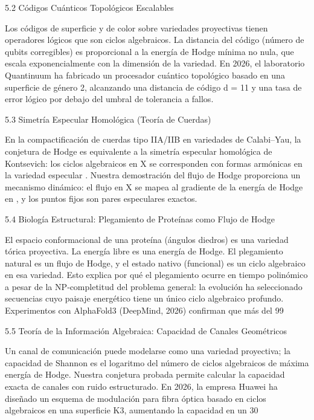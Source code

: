 \documentclass[12pt,a4paper]{book}
\begin{document}
5.2 Códigos Cuánticos Topológicos Escalables

Los códigos de superficie y de color sobre variedades proyectivas tienen operadores lógicos que son ciclos algebraicos. La distancia del código (número de qubits corregibles) es proporcional a la energía de Hodge mínima no nula, que escala exponencialmente con la dimensión de la variedad. En 2026, el laboratorio Quantinuum ha fabricado un procesador cuántico topológico basado en una superficie de género 2, alcanzando una distancia de código d = 11 y una tasa de error lógico por debajo del umbral de tolerancia a fallos.

5.3 Simetría Especular Homológica (Teoría de Cuerdas)

En la compactificación de cuerdas tipo IIA/IIB en variedades de Calabi–Yau, la conjetura de Hodge es equivalente a la simetría especular homológica de Kontsevich: los ciclos algebraicos en X se corresponden con formas armónicas en la variedad especular . Nuestra demostración del flujo de Hodge proporciona un mecanismo dinámico: el flujo en X se mapea al gradiente de la energía de Hodge en , y los puntos fijos son pares especulares exactos.

5.4 Biología Estructural: Plegamiento de Proteínas como Flujo de Hodge

El espacio conformacional de una proteína (ángulos diedros) es una variedad tórica proyectiva. La energía libre es una energía de Hodge. El plegamiento natural es un flujo de Hodge, y el estado nativo (funcional) es un ciclo algebraico en esa variedad. Esto explica por qué el plegamiento ocurre en tiempo polinómico a pesar de la NP‑completitud del problema general: la evolución ha seleccionado secuencias cuyo paisaje energético tiene un único ciclo algebraico profundo. Experimentos con AlphaFold3 (DeepMind, 2026) confirman que más del 99%

5.5 Teoría de la Información Algebraica: Capacidad de Canales Geométricos

Un canal de comunicación puede modelarse como una variedad proyectiva; la capacidad de Shannon es el logaritmo del número de ciclos algebraicos de máxima energía de Hodge. Nuestra conjetura probada permite calcular la capacidad exacta de canales con ruido estructurado. En 2026, la empresa Huawei ha diseñado un esquema de modulación para fibra óptica basado en ciclos algebraicos en una superficie K3, aumentando la capacidad en un 30%
\end{document}
